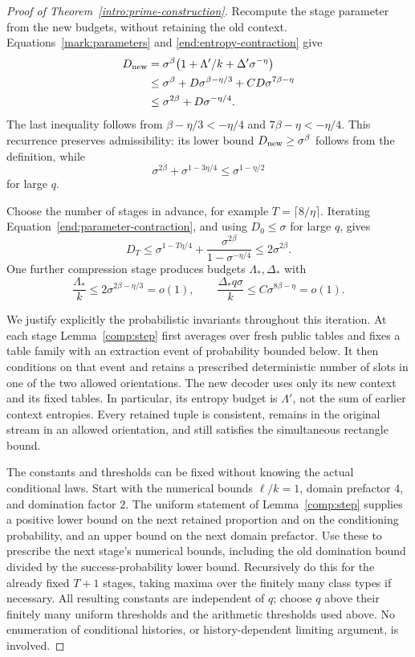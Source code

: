 \begin{proof}[Proof of Theorem~\ref{intro:prime-construction}]
Recompute the stage parameter from the new budgets, without retaining
the old context. Equations~\eqref{mark:parameters} and
\eqref{end:entropy-contraction} give
\begin{align}
 D_{\rm new}
 &=\sigma^\beta\bigl(1+\Lambda'/k+\Delta'\sigma^{-\eta}\bigr)
   \notag\\
 &\le\sigma^\beta
     +D\sigma^{\beta-\eta/3}+CD\sigma^{7\beta-\eta}
   \notag\\
 &\le\sigma^{2\beta}+D\sigma^{-\eta/4}.
 \label{end:parameter-contraction}
\end{align}
The last inequality follows from
$\beta-\eta/3<-\eta/4$ and $7\beta-\eta<-\eta/4$.
This recurrence preserves admissibility: its lower bound
$D_{\rm new}\ge\sigma^\beta$ follows from the definition, while
\[
 \sigma^{2\beta}+\sigma^{1-3\eta/4}
 \le\sigma^{1-\eta/2}
\]
for large $q$.

Choose the number of stages in advance, for example
$T=\lceil8/\eta\rceil$. Iterating
Equation~\eqref{end:parameter-contraction}, and using $D_0\le\sigma$
for large $q$, gives
\[
 D_T\le\sigma^{1-T\eta/4}
       +\frac{\sigma^{2\beta}}{1-\sigma^{-\eta/4}}
       \le2\sigma^{2\beta}.
\]
One further compression stage produces budgets $\Lambda_*,\Delta_*$
with
\begin{equation}
 \frac{\Lambda_*}{k}
     \le2\sigma^{2\beta-\eta/3}=o(1),
 \qquad
 \frac{\Delta_*q\sigma}{k}
     \le C\sigma^{8\beta-\eta}=o(1).
 \label{end:final-budgets}
\end{equation}

We justify explicitly the probabilistic invariants throughout this
iteration. At each stage Lemma~\ref{comp:step} first averages over
fresh public tables and fixes a table family with an extraction event
of probability bounded below. It then conditions on that event and
retains a prescribed deterministic number of slots in one of the two
allowed orientations. The new decoder uses only its new context and
its fixed tables. In particular, its entropy budget is $\Lambda'$,
not the sum of earlier context entropies. Every retained tuple is
consistent, remains in the original stream in an allowed orientation,
and still satisfies the simultaneous rectangle bound.

The constants and thresholds can be fixed without knowing the actual
conditional laws. Start with the numerical bounds $\ell/k=1$, domain
prefactor $4$, and domination factor $2$. The uniform statement of
Lemma~\ref{comp:step} supplies a positive lower bound on the next
retained proportion and on the conditioning probability, and an upper
bound on the next domain prefactor. Use these to prescribe the next
stage's numerical bounds, including the old domination bound divided
by the success-probability lower bound. Recursively do this for the
already fixed $T+1$ stages, taking maxima over the finitely many class
types if necessary. All resulting constants are independent of $q$;
choose $q$ above their finitely many uniform thresholds and the
arithmetic thresholds used above. No enumeration of conditional
histories, or history-dependent limiting argument, is involved.


\end{proof}
